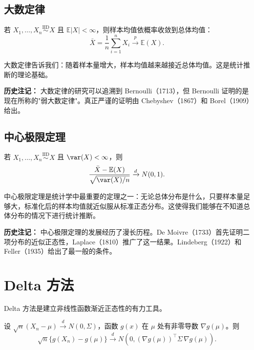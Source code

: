 \subsection{大数定律}

\begin{Theorem}[弱大数定律]\label{eq:lln}
若 $X_1, \ldots, X_n \stackrel{\text{IID}}{\sim} X$ 且 $\mathbb{E}|X| < \infty$，则样本均值依概率收敛到总体均值：
\[
\bar{X} = \frac{1}{n}\sum_{i=1}^n X_i \xrightarrow{p} \mathbb{E}(X).
\]
\end{Theorem}

大数定律告诉我们：随着样本量增大，样本均值越来越接近总体均值。这是统计推断的理论基础。

\textbf{历史注记：} 大数定律的研究可以追溯到 Bernoulli（1713），但 Bernoulli 证明的是现在所称的"弱大数定律"。真正严谨的证明由 Chebyshev（1867）和 Borel（1909）给出。

\subsection{中心极限定理}

\begin{Theorem}[中心极限定理]\label{eq:clt}
若 $X_1, \ldots, X_n \stackrel{\text{IID}}{\sim} X$ 且 $\var(X) < \infty$，则
\[
\frac{\bar{X} - \mathbb{E}(X)}{\sqrt{\var(X) / n}} \xrightarrow{d} N(0, 1).
\]
\end{Theorem}

中心极限定理是统计学中最重要的定理之一：无论总体分布是什么，只要样本量足够大，标准化后的样本均值就近似服从标准正态分布。这使得我们能够在不知道总体分布的情况下进行统计推断。

\textbf{历史注记：} 中心极限定理的发展经历了漫长历程。De Moivre（1733）首先证明二项分布的近似正态性，Laplace（1810）推广了这一结果。Lindeberg（1922）和 Feller（1935）给出了最一般的条件。

\section{Delta 方法}

Delta 方法是建立非线性函数渐近正态性的有力工具。

\begin{Theorem}[Delta 方法]\label{eq:delta-method}
设 $\sqrt{n}(X_n - \mu) \xrightarrow{d} N(0, \Sigma)$，函数 $g(x)$ 在 $\mu$ 处有非零导数 $\nabla g(\mu)$。则
\[
\sqrt{n}\{g(X_n) - g(\mu)\} \xrightarrow{d} N\left(0, (\nabla g(\mu))^\top \Sigma \, \nabla g(\mu)\right).
\]
\end{Theorem}

